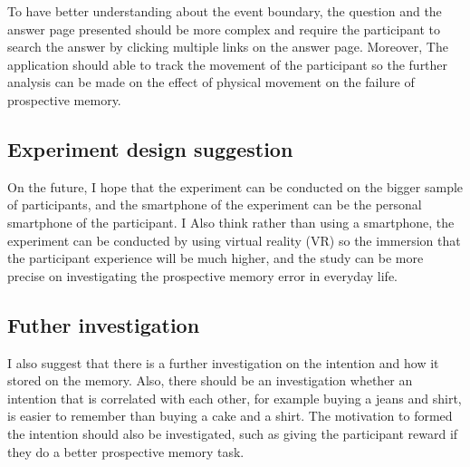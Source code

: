 To have better understanding about the event boundary, the question and the answer page presented should be more complex and require
the participant to search the answer by clicking multiple links on the answer page.
Moreover, The application should able to track the movement of the participant so the further analysis can be made on the effect of physical movement
on the failure of prospective memory.


\subsection{Experiment design suggestion}
On the future, I hope that the experiment can be conducted on the bigger sample of participants, and the smartphone of the experiment can be the
personal smartphone of the participant.
I Also think rather than using a smartphone, the experiment can be conducted by using virtual reality (VR) so the immersion that the participant experience
will be much higher, and the study can be more precise on investigating the prospective memory error in everyday life.

\subsection{Futher investigation}
I also suggest that there is a further investigation on the intention and how it stored on the memory. Also, there should be an investigation
whether an intention that is correlated with each other, for example buying a jeans and shirt, is easier to remember than
buying a cake and a shirt. The motivation to formed the intention should also be investigated, such as giving the participant reward if they do
a better prospective memory task.



